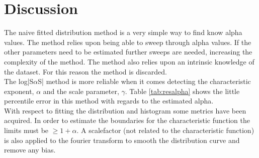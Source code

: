 \chapter{Discussion}
The naive fitted distribution method is a very simple way to find know alpha values. 
The method relies upon being able to sweep through alpha values. 
If the other parameters need to be estimated further sweeps are needed, increasing the complexity of the method. 
The method also relies upon an intrinsic knowledge of the dataset. 
For this reason the method is discarded.\\
The log|S$\alpha$S| method is more reliable when it comes detecting the characteristic exponent, $\alpha$ and the scale parameter, $\gamma$. Table \ref{tab:resalpha} shows the little percentile error in this method with regards to the estimated alpha.\\
With respect to fitting the distribution and histogram some metrics have been acquired. In order to estimate the boundaries for the characteristic function the limits must be  $\geq 1 + \alpha$. A scalefactor (not related to the characteristic function) is also applied to the fourier transform to smooth the distribution curve and remove any bias.\\


